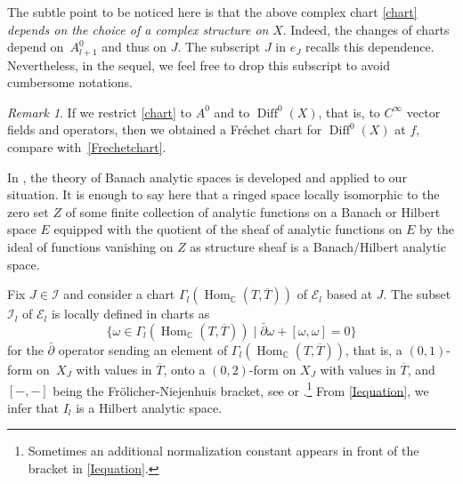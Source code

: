 \documentclass[10pt]{amsart}
\let\mathcal\mathscr
\DeclareMathOperator{\Diff}{Diff}
\DeclareMathOperator{\Hom}{Hom}
\theoremstyle{plain}
\theoremstyle{definition}
\theoremstyle{remark}
\newtheorem{remark}[theorem]{Remark}
\numberwithin{equation}{section}
\newcommand{\CC}{{\mathbb{C}}}
\newcommand{\cI}{\mathcal{I}}
\begin{document}
The subtle point to be noticed here is that the above complex chart \eqref{chart} \emph{depends on the choice of a complex structure on} $X$. Indeed, the changes of charts depend on~$A^0_{l+1}$ and thus on $J$. The subscript $J$ in $e_J$ recalls this dependence. Nevertheless, in the sequel, we feel free to drop this subscript to avoid cumbersome notations.

\begin{remark}
\label{rkFrechetHilbertchart}
If we restrict \eqref{chart} to $A^0$ and to $\Diff^0(X)$, that is, to $C^\infty$ vector fields and operators, then we obtained a Fréchet chart for $\Diff^0(X)$ at $f$, compare with~\eqref{Frechetchart}.
\end{remark}
In \cite{Douady}, the theory of Banach analytic spaces is developed and applied to our situation. It is enough to say here that a ringed space locally isomorphic to the zero set $Z$ of some finite collection of analytic functions on a Banach or Hilbert space $E$ equipped with the quotient of the sheaf of analytic functions on $E$ by the ideal of functions vanishing on $Z$ as structure sheaf is a Banach/Hilbert analytic space.

Fix $J\in\cI$ and consider a chart $\Gamma_l(\Hom_{\CC}(T,\overline{T}))$ of $\mathcal E_l$ based at $J$. The subset $\cI_l$ of $\mathcal E_l$ is locally defined in charts as
\begin{equation}
\label{Iequation}
\{\omega\in \Gamma_l(\Hom_{\CC}(T,\overline{T}))\mid \bar\partial\omega+[\omega,\omega]=0\}
\end{equation}
for the $\bar\partial$ operator sending an element of $\Gamma_l(\Hom_{\CC}(T,\overline{T}))$, that is, a $(0,1)$-form on~$X_J$ with values in $\overline{T}$, onto a $(0,2)$-form on $X_J$ with values in $\overline{T}$, and $[-,-]$ being the Frölicher-Niejenhuis bracket, see \cite{Kur1} or \cite[Ch.\,4.1]{MK}.\footnote{Sometimes an additional normalization constant appears in front of the bracket in \eqref{Iequation}.} From \eqref{Iequation}, we infer that $I_l$ is a Hilbert analytic space.
\end{document}
